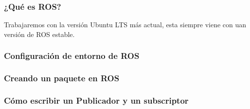 \begin{frame}
	\frametitle{¿Qué es ROS?}
	  Trabajaremos con la versión Ubuntu LTS más actual, esta siempre viene con uan versión de ROS estable.
	
	\begin{figure}[!h]
		\centering
	\end{figure}

\end{frame}

\begin{frame}
	\frametitle{Configuración de entorno de ROS}
	
	
\end{frame}

\begin{frame}
	\frametitle{Creando un paquete en ROS}
	
	
\end{frame}

\begin{frame}
	\frametitle{Cómo escribir un Publicador y un subscriptor}

\end{frame}


